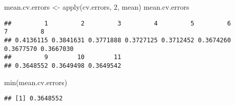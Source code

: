 \documentclass[
]{article}
\newenvironment{Shaded}{\begin{snugshade}}{\end{snugshade}}
\newcommand{\AttributeTok}[1]{\textcolor[rgb]{0.77,0.63,0.00}{#1}}
\newcommand{\ControlFlowTok}[1]{\textcolor[rgb]{0.13,0.29,0.53}{\textbf{#1}}}
\newcommand{\DecValTok}[1]{\textcolor[rgb]{0.00,0.00,0.81}{#1}}
\newcommand{\FunctionTok}[1]{\textcolor[rgb]{0.00,0.00,0.00}{#1}}
\newcommand{\NormalTok}[1]{#1}
\newcommand{\OtherTok}[1]{\textcolor[rgb]{0.56,0.35,0.01}{#1}}
\newcommand{\SpecialCharTok}[1]{\textcolor[rgb]{0.00,0.00,0.00}{#1}}
\begin{document}
\begin{Shaded}
\end{Shaded}

\begin{Shaded}
\begin{Highlighting}[]
\NormalTok{mean.cv.errors }\OtherTok{\textless{}{-}} \FunctionTok{apply}\NormalTok{(cv.errors, }\DecValTok{2}\NormalTok{, mean)}
\NormalTok{mean.cv.errors}
\end{Highlighting}
\end{Shaded}

\begin{verbatim}
##         1         2         3         4         5         6         7         8 
## 0.4136115 0.3841631 0.3771888 0.3727125 0.3712452 0.3674260 0.3677570 0.3667030 
##         9        10        11 
## 0.3648552 0.3649498 0.3649542
\end{verbatim}

\begin{Shaded}
\begin{Highlighting}[]
\FunctionTok{min}\NormalTok{(mean.cv.errors)}
\end{Highlighting}
\end{Shaded}

\begin{verbatim}
## [1] 0.3648552
\end{verbatim}
\end{document}
